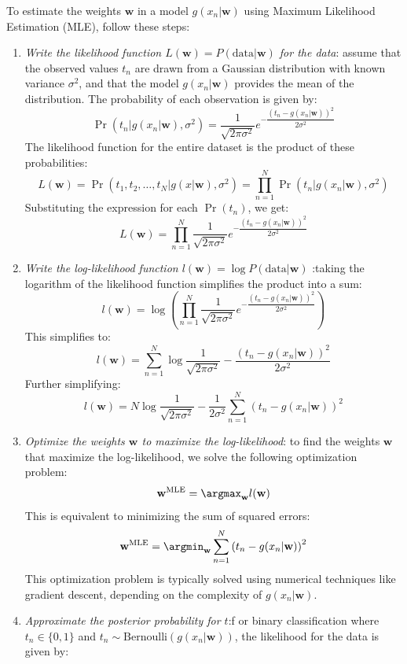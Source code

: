 \begin{example}
    To estimate the weights $\mathbf{w}$ in a model $g(x_n|\mathbf{w})$ using Maximum Likelihood Estimation (MLE), follow these steps:
    \begin{enumerate}
        \item \textit{Write the likelihood function $L(\mathbf{w}) = P(\text{data}|\mathbf{w})$ for the data}: assume that the observed values $t_n$ are drawn from a Gaussian distribution with known variance $\sigma^2$, and that the model $g(x_n|\mathbf{w})$ provides the mean of the distribution. The probability of each observation is given by:
            \[\Pr(t_n|g(x_n|\mathbf{w}), \sigma^2) = \dfrac{1}{\sqrt{2\pi\sigma^2}} e^{-\dfrac{(t_n - g(x_n|\mathbf{w}))^2}{2\sigma^2}}\]
            The likelihood function for the entire dataset is the product of these probabilities:
            \[L(\mathbf{w}) = \Pr(t_1, t_2, \dots, t_N|g(x|\mathbf{w}), \sigma^2) = \prod_{n=1}^N \Pr(t_n|g(x_n|\mathbf{w}), \sigma^2)\]
            Substituting the expression for each $\Pr(t_n)$, we get:
            \[L(\mathbf{w}) = \prod_{n=1}^N \dfrac{1}{\sqrt{2\pi\sigma^2}} e^{-\dfrac{(t_n - g(x_n|\mathbf{w}))^2}{2\sigma^2}}\]
        \item \textit{Write the log-likelihood function $l(\mathbf{w}) = \log P(\text{data}|\mathbf{w})$} :taking the logarithm of the likelihood function simplifies the product into a sum:
            \[l(\mathbf{w}) = \log\left( \prod_{n=1}^N \dfrac{1}{\sqrt{2\pi\sigma^2}} e^{-\dfrac{(t_n - g(x_n|\mathbf{w}))^2}{2\sigma^2}} \right)\]
            This simplifies to:
            \[l(\mathbf{w}) = \sum_{n=1}^N \log \dfrac{1}{\sqrt{2\pi\sigma^2}} - \dfrac{(t_n - g(x_n|\mathbf{w}))^2}{2\sigma^2}\]
            Further simplifying:
            \[l(\mathbf{w}) = N \log \dfrac{1}{\sqrt{2\pi\sigma^2}} - \dfrac{1}{2\sigma^2} \sum_{n=1}^N (t_n - g(x_n|\mathbf{w}))^2\]
        \item \textit{Optimize the weights $\mathbf{w}$ to maximize the log-likelihood}: to find the weights $\mathbf{w}$ that maximize the log-likelihood, we solve the following optimization problem:
            \[\mathbf{w}^{\text{MLE}} = \argmax_{\mathbf{w}} l(\mathbf{w})\]
            This is equivalent to minimizing the sum of squared errors:
            \[\mathbf{w}^{\text{MLE}} = \argmin_{\mathbf{w}} \sum_{n=1}^N \left( t_n - g(x_n|\mathbf{w}) \right)^2\]
            This optimization problem is typically solved using numerical techniques like gradient descent, depending on the complexity of $g(x_n|\mathbf{w})$.
        \item \textit{Approximate the posterior probability for $t$}:f or binary classification where $t_n \in \{0, 1\}$ and $t_n \sim \text{Bernoulli}(g(x_n|\mathbf{w}))$, the likelihood for the data is given by:

\end{enumerate}
\end{example}
